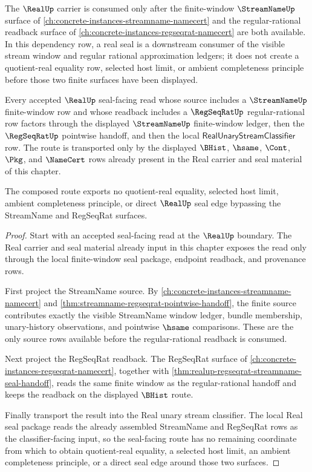 The $\RealUp$ carrier is consumed only after the finite-window $\StreamNameUp$ surface of \autoref{ch:concrete-instances-streamname-namecert} and the regular-rational readback surface of \autoref{ch:concrete-instances-regseqrat-namecert} are both available. In this dependency row, a real seal is a downstream consumer of the visible stream window and regular rational approximation ledgers; it does not create a quotient-real equality row, selected host limit, or ambient completeness principle before those two finite surfaces have been displayed.

\begin{theorem}
\label{thm:real-streamname-regseqrat-pointwise-seal-composition}
Every accepted $\RealUp$ seal-facing read whose source includes a
$\StreamNameUp$ finite-window row and whose readback includes a
$\RegSeqRatUp$ regular-rational row factors through the displayed
$\StreamNameUp$ finite-window ledger, then the $\RegSeqRatUp$ pointwise
handoff, and then the local $\mathsf{RealUnaryStreamClassifier}$ row. The
route is transported only by the displayed $\BHist$, $\hsame$, $\Cont$,
$\Pkg$, and $\NameCert$ rows already present in the Real carrier and seal
material of this chapter.

The composed route exports no quotient-real equality, selected host limit,
ambient completeness principle, or direct $\RealUp$ seal edge bypassing the
StreamName and RegSeqRat surfaces.
\end{theorem}
\begin{proof}
Start with an accepted seal-facing read at the $\RealUp$ boundary. The Real
carrier and seal material already input in this chapter exposes the read only
through the local finite-window seal package, endpoint readback, and
provenance rows.

First project the StreamName source. By
\autoref{ch:concrete-instances-streamname-namecert} and
\autoref{thm:streamname-regseqrat-pointwise-handoff}, the finite source
contributes exactly the visible StreamName window ledger, bundle membership,
unary-history observations, and pointwise $\hsame$ comparisons. These are the
only source rows available before the regular-rational readback is consumed.

Next project the RegSeqRat readback. The RegSeqRat surface of
\autoref{ch:concrete-instances-regseqrat-namecert}, together with
\autoref{thm:realup-regseqrat-streamname-seal-handoff}, reads the same
finite window as the regular-rational handoff and keeps the readback on the
displayed $\BHist$ route.

Finally transport the result into the Real unary stream classifier. The local
Real seal package reads the already assembled StreamName and RegSeqRat rows
as the classifier-facing input, so the seal-facing route has no remaining
coordinate from which to obtain quotient-real equality, a selected host
limit, an ambient completeness principle, or a direct seal edge around those
two surfaces.
\end{proof}

